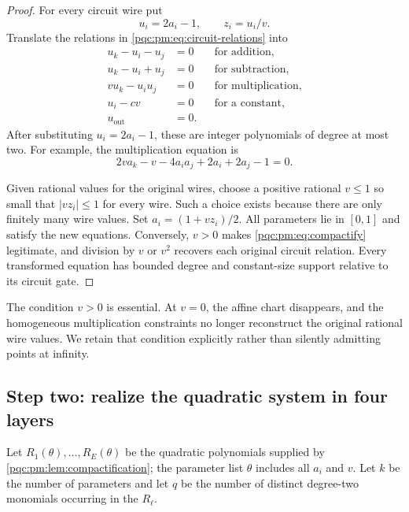 \documentclass[11pt,letterpaper]{article}
\numberwithin{equation}{section}
\theoremstyle{definition}
\theoremstyle{remark}
\begin{document}
\begin{proof}
For every circuit wire put
\begin{equation}\label{pqc:pm:eq:compactify}
 u_i=2a_i-1,\qquad z_i=u_i/v.
\end{equation}
Translate the relations in \eqref{pqc:pm:eq:circuit-relations} into
\begin{align}
 u_k-u_i-u_j&=0 &&\text{for addition},\label{pqc:pm:eq:bounded-add}\\
 u_k-u_i+u_j&=0 &&\text{for subtraction},\label{pqc:pm:eq:bounded-sub}\\
 vu_k-u_iu_j&=0 &&\text{for multiplication},\label{pqc:pm:eq:bounded-mul}\\
 u_i-cv&=0 &&\text{for a constant},\label{pqc:pm:eq:bounded-const}\\
 u_{\mathrm{out}}&=0.\label{pqc:pm:eq:bounded-out}
\end{align}
After substituting $u_i=2a_i-1$, these are integer polynomials of degree at
most two. For example, the multiplication equation is
\begin{equation}\label{pqc:pm:eq:expanded-mul}
 2va_k-v-4a_ia_j+2a_i+2a_j-1=0.
\end{equation}

Given rational values for the original wires, choose a positive rational
$v\leq1$ so small that $|vz_i|\leq1$ for every wire. Such a choice exists
because there are only finitely many wire values. Set $a_i=(1+vz_i)/2$.
All parameters lie in $[0,1]$ and satisfy the new equations. Conversely,
$v>0$ makes \eqref{pqc:pm:eq:compactify} legitimate, and division by $v$ or $v^2$
recovers each original circuit relation. Every transformed equation has
bounded degree and constant-size support relative to its circuit gate.
\end{proof}

The condition $v>0$ is essential. At $v=0$, the affine chart disappears,
and the homogeneous multiplication constraints no longer reconstruct the
original rational wire values. We retain that condition explicitly rather
than silently admitting points at infinity.

\subsection{Step two: realize the quadratic system in four layers}

Let $R_1(\theta),\ldots,R_E(\theta)$ be the quadratic polynomials supplied by
\cref{pqc:pm:lem:compactification}; the parameter list $\theta$ includes all $a_i$
and $v$. Let $k$ be the number of parameters and let $q$ be the number of
distinct degree-two monomials occurring in the $R_\ell$.
\end{document}
